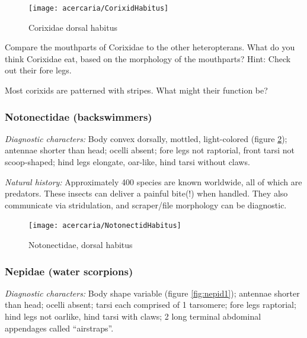 \begin{figure}[ht!]
 \centering
 \texttt{[image: acercaria/CorixidHabitus]}
 \caption{Corixidae dorsal habitus \citep[][Plate 7, Fig. 5]{bhl37902}}
 \label{fig:corix1}
\end{figure}

\begin{theo}
{}Compare the mouthparts of Corixidae to the other heteropterans. What do you think Corixidae eat, based on the morphology of the mouthparts? Hint: Check out their fore legs.\vspace{3mm}

\noindent{}Most corixids are patterned with stripes. What might their function be?
\end{theo}

\subsubsection{Notonectidae (backswimmers)}
\noindent{}\textit{Diagnostic characters:} Body convex dorsally, mottled, light-colored (figure \ref{fig:notonect1}); antennae shorter than head; ocelli absent; fore legs not raptorial, front tarsi not scoop-shaped; hind legs elongate, oar-like, hind tarsi without claws.\vspace{3mm}

\noindent{}\textit{Natural history:} Approximately 400 species are known worldwide, all of which are predators. These insects can deliver a painful bite(!) when handled. They also communicate via stridulation, and scraper/file morphology can be diagnostic.\vspace{3mm}

\begin{figure}[ht!]
 \centering
 \texttt{[image: acercaria/NotonectidHabitus]}
 \caption{Notonectidae, dorsal habitus \citep[][Plate 7, Fig. 2]{bhl37902}}
 \label{fig:notonect1}
\end{figure}

\subsubsection{Nepidae (water scorpions)}
\noindent{}\textit{Diagnostic characters:} Body shape variable (figure \ref{fig:nepid1}); antennae shorter than head; ocelli absent; tarsi each comprised of 1 tarsomere; fore legs raptorial; hind legs not oarlike, hind tarsi with claws; 2 long terminal abdominal appendages called ``airstraps''.\vspace{3mm}

